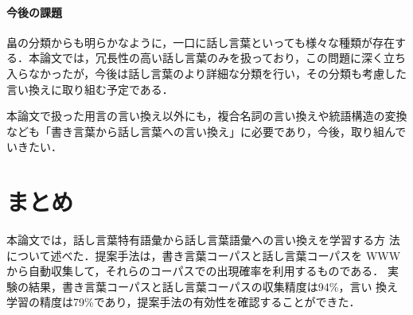 \documentclass{nlp}
\begin{document}
\paragraph{今後の課題}
畠の分類からも明らかなように，一口に話し言葉といっても様々な種類が存在す
る．本論文では，冗長性の高い話し言葉のみを扱っており，この問題に深く立ち
入らなかったが，今後は話し言葉のより詳細な分類を行い，その分類も考慮した
言い換えに取り組む予定である．

本論文で扱った用言の言い換え以外にも，複合名詞の言い換えや統語構造の変換
なども「書き言葉から話し言葉への言い換え」に必要であり，今後，取り組んで
いきたい．


\section{まとめ}
本論文では，話し言葉特有語彙から話し言葉語彙への言い換えを学習する方
法について述べた．提案手法は，書き言葉コーパスと話し言葉コーパスを
WWWから自動収集して，それらのコーパスでの出現確率を利用するものである．
実験の結果，書き言葉コーパスと話し言葉コーパスの収集精度は94\%，言い
換え学習の精度は79\%であり，提案手法の有効性を確認することができた．
\end{document}
